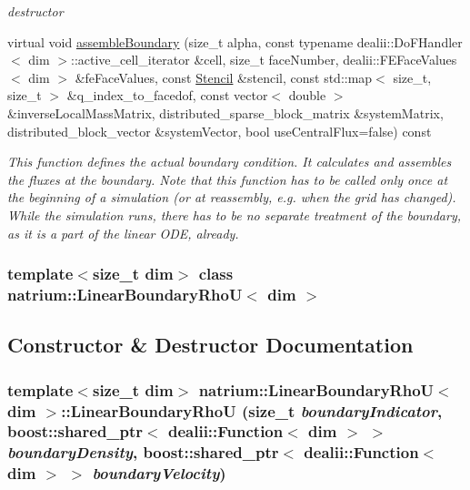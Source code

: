 \begin{DoxyCompactItemize}
\begin{DoxyCompactList}\small\item\em destructor \item\end{DoxyCompactList}\item 
virtual void \hyperlink{classnatrium_1_1LinearBoundaryRhoU_a9fecb00df16c4294d9852222ddbdb4ca}{assembleBoundary} (size\_\-t alpha, const typename dealii::DoFHandler$<$ dim $>$::active\_\-cell\_\-iterator \&cell, size\_\-t faceNumber, dealii::FEFaceValues$<$ dim $>$ \&feFaceValues, const \hyperlink{classnatrium_1_1Stencil}{Stencil} \&stencil, const std::map$<$ size\_\-t, size\_\-t $>$ \&q\_\-index\_\-to\_\-facedof, const vector$<$ double $>$ \&inverseLocalMassMatrix, distributed\_\-sparse\_\-block\_\-matrix \&systemMatrix, distributed\_\-block\_\-vector \&systemVector, bool useCentralFlux=false) const 
\begin{DoxyCompactList}\small\item\em This function defines the actual boundary condition. It calculates and assembles the fluxes at the boundary. Note that this function has to be called only once at the beginning of a simulation (or at reassembly, e.g. when the grid has changed). While the simulation runs, there has to be no separate treatment of the boundary, as it is a part of the linear ODE, already. \item\end{DoxyCompactList}\end{DoxyCompactItemize}
\subsubsection*{template$<$size\_\-t dim$>$ class natrium::LinearBoundaryRhoU$<$ dim $>$}



\subsection{Constructor \& Destructor Documentation}
\hypertarget{classnatrium_1_1LinearBoundaryRhoU_a72588bbed7cb004e02aaa562083a5527}{
\subsubsection[{LinearBoundaryRhoU}]{\setlength{\rightskip}{0pt plus 5cm}template$<$size\_\-t dim$>$ {\bf natrium::LinearBoundaryRhoU}$<$ dim $>$::{\bf LinearBoundaryRhoU} (size\_\-t {\em boundaryIndicator}, \/  boost::shared\_\-ptr$<$ dealii::Function$<$ dim $>$ $>$ {\em boundaryDensity}, \/  boost::shared\_\-ptr$<$ dealii::Function$<$ dim $>$ $>$ {\em boundaryVelocity})}}
\label{classnatrium_1_1LinearBoundaryRhoU_a72588bbed7cb004e02aaa562083a5527}


